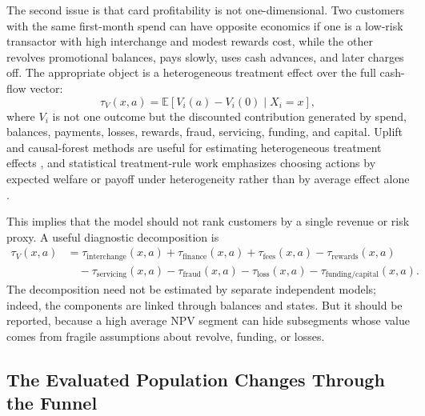 \documentclass[11pt]{article}
\newcommand{\E}{\mathbb{E}}
\newcommand{\1}{\mathbf{1}}
\begin{document}
The second issue is that card profitability is not one-dimensional. Two
customers with the same first-month spend can have opposite economics if one is
a low-risk transactor with high interchange and modest rewards cost, while the
other revolves promotional balances, pays slowly, uses cash advances, and later
charges off. The appropriate object is a heterogeneous treatment effect over
the full cash-flow vector:
\begin{equation}
  \tau_{V}(x,a)
  =
  \E[V_i(a)-V_i(0)\mid X_i=x],
  \label{eq:value-cate}
\end{equation}
where $V_i$ is not one outcome but the discounted contribution generated by
spend, balances, payments, losses, rewards, fraud, servicing, funding, and
capital. Uplift and causal-forest methods are useful for estimating
heterogeneous treatment effects \citep{lo2002true,wager2018causalforests,chernozhukov2018dml},
and statistical treatment-rule work emphasizes choosing actions by expected
welfare or payoff under heterogeneity rather than by average effect alone
\citep{manski2004treatment}.

This implies that the model should not rank customers by a single revenue or
risk proxy. A useful diagnostic decomposition is
\begin{align}
  \tau_{V}(x,a)
  &=
  \tau_{\mathrm{interchange}}(x,a)
  + \tau_{\mathrm{finance}}(x,a)
  + \tau_{\mathrm{fees}}(x,a)
  - \tau_{\mathrm{rewards}}(x,a) \nonumber\\
  &\quad
  - \tau_{\mathrm{servicing}}(x,a)
  - \tau_{\mathrm{fraud}}(x,a)
  - \tau_{\mathrm{loss}}(x,a)
  - \tau_{\mathrm{funding/capital}}(x,a).
  \label{eq:value-cate-decomposition}
\end{align}
The decomposition need not be estimated by separate independent models; indeed,
the components are linked through balances and states. But it should be
reported, because a high average NPV segment can hide subsegments whose value
comes from fragile assumptions about revolve, funding, or losses.

\subsection{The Evaluated Population Changes Through the Funnel}
\label{subsec:funnel-population}
\end{document}
